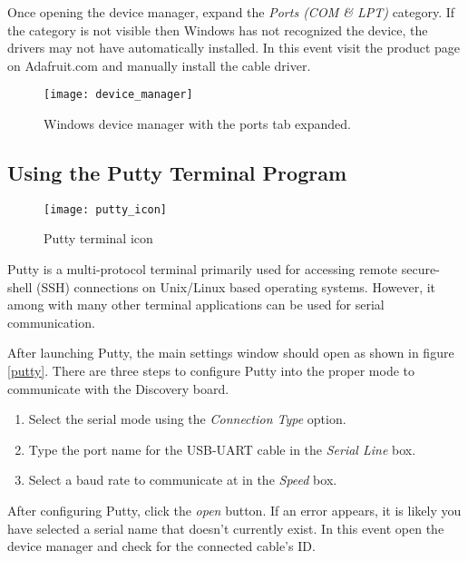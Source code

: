\documentclass[11pt,fleqn]{book} %
\begin{document}
Once opening the device manager, expand the \textit{Ports (COM \& LPT)} category. If the category is not visible then Windows has not recognized the device, the drivers may not have automatically installed. In this event visit the product page on Adafruit.com and manually install the cable driver.  
\begin{figure}[]
    \centering\texttt{[image: device\_manager]}
    \caption{Windows device manager with the ports tab expanded.}
    \label{device_manager}
\end{figure}

\subsection{Using the Putty Terminal Program}


\begin{wrapfigure}[8]{h!R}{0.2\textwidth}
    \centering\texttt{[image: putty\_icon]}
    \caption{Putty terminal icon}
    \label{uvision_logo}
\end{wrapfigure}

Putty is a multi-protocol terminal primarily used for accessing remote secure-shell (SSH) connections on Unix/Linux based operating systems. However, it among with many other terminal applications can be used for serial communication.

After launching Putty, the main settings window should open as shown in figure \ref{putty}. There are three steps to configure Putty into the proper mode to communicate with the Discovery board. 
\begin{enumerate}
    \item Select the serial mode using the \textit{Connection Type} option. 
    \item Type the port name for the USB-UART cable in the \textit{Serial Line} box.
    \item Select a baud rate to communicate at in the \textit{Speed} box.
\end{enumerate}

After configuring Putty, click the \textit{open} button. If an error appears, it is likely you have selected a serial name that doesn't currently exist. In this event open the device manager and check for the connected cable's ID. 
\end{document}
